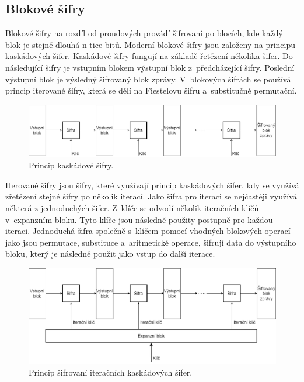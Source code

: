 \subsection{Blokové šifry \label{subsec:blockFunction}}%
Blokové šifry na rozdíl od proudových provádí šifrovaní po blocích, kde každý blok je stejně dlouhá n-tice bitů. Moderní blokové šifry jsou založeny na principu kaskádových šifer. Kaskádové šifry fungují na základě řetězení několika šifer. Do následující šifry je vstupním blokem výstupní blok z~předcházející šifry. Poslední výstupní blok je výsledný šifrovaný blok zprávy. V~blokových šifrách se používá princip iterované šifry, která se dělí na Fiestelovu šifru a~substitučně permutační.\cite{Burda9788021446120ISBN}
\begin{figure}[!h]
  \begin{center}
    \includegraphics[scale=0.3]{obrazky/cascadeCipher.png}
  \end{center}
  \caption[Kaskádová šifra]{Princip kaskádové šifry.\cite{Burda9788021446120ISBN}}
  \label{img:CascadeCipher}
\end{figure}

Iterované šifry jsou šifry, které využívají princip kaskádových šifer, kdy se využívá zřetězení stejné šifry po několik iterací. Jako šifra pro iteraci se nejčastěji využívá některá z jednoduchých šifer. Z~klíče se odvodí několik iteračních klíčů v~expanzním bloku. Tyto klíče jsou následně použity postupně pro každou iteraci. Jednoduchá šifra společně s~klíčem pomocí vhodných blokových operací jako jsou permutace, substituce a~aritmetické operace, šifrují data do výstupního bloku, který je následně použit jako vstup do další iterace.\cite{Burda9788021446120ISBN}
\begin{figure}[!h]
  \begin{center}
    \includegraphics[scale=0.3]{obrazky/IterateCipher.png}
  \end{center}
  \caption[Iterační kaskádová šifra]{Princip šifrovaní iteračních kaskádových šifer.\cite{Burda9788021446120ISBN}}
  \label{img:iterateCipher}
\end{figure}

